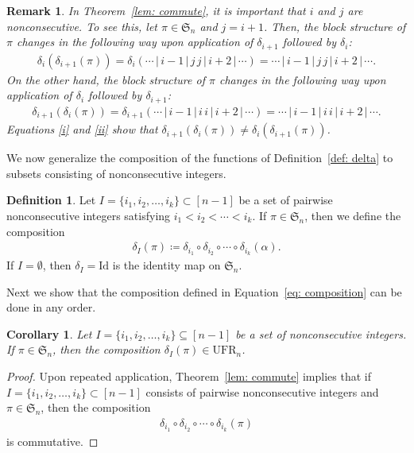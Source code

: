 \documentclass[11pt,reqno]{amsart}
\newtheorem{corollary}{Corollary}[section]
\newtheorem{remark}{Remark}[section]
\theoremstyle{definition}
\newtheorem{definition}{Definition}[section]
\theoremstyle{notation}
\theoremstyle{openproblem}
\newcommand{\Sym}{\mathfrak{S}}
\newcommand{\UFR}[1]{\text{UFR}_{#1}}
\begin{document}
\begin{remark}
\label{rem:nocommute}
    In Theorem~\ref{lem: commute}, it is important that $i$ and $j$ are nonconsecutive. 
    To see this, let $\pi \in \Sym_n$ and $j=i+1$. 
    Then, the block structure of $\pi$ changes in the following way upon application of $\delta_{i+1}$ followed by $\delta_i$:
    \begin{align}\label{i}
    \delta_i(\delta_{i+1}(\pi))=\delta_i(\cdots\,|\,i-1\,|\,j\,j\,|\,i+2\,|\,\cdots) = \cdots\,|\,i-1\,|\,j\,j\,|\,i+2\,|\,\cdots.
    \end{align}
    On the other hand, 
    the block structure of $\pi$ changes in the following way upon application of $\delta_{i}$ followed by $\delta_{i+1}$:
    \begin{align}
        \delta_{i+1}(\delta_i(\pi))=\delta_{i+1}(\cdots\,|\,i-1\,|\,i\,i\,|\,i+2\,|\,\cdots)=\cdots\,|\,i-1\,|\,i\,i\,|\,i+2\,|\,\cdots.\label{ii} 
    \end{align}
    Equations \eqref{i} and \eqref{ii} show that $\delta_{i+1}(\delta_i(\pi)) \neq \delta_i(\delta_{i+1}(\pi))$.
\end{remark}

We now generalize the composition of the functions of Definition~\ref{def: delta} to subsets consisting of nonconsecutive integers.

\begin{definition}
    Let $I=\{i_1,i_2,\ldots,i_k\} \subset [n-1]$ be a set of pairwise nonconsecutive integers satisfying $i_1<i_2<\cdots<i_k$. 
    If $\pi \in \Sym_n$, then we define the composition 
\begin{align}
\label{eq: composition}
\delta_I(\pi)\coloneqq\delta_{i_1}\circ \delta_{i_2}\circ\cdots\circ\delta_{i_k}(\alpha).
\end{align} 
If $I=\emptyset$, then $\delta_I = \mbox{Id}$ is the identity map on $\Sym_n$.
\end{definition}

Next we show that the composition defined in Equation~\eqref{eq: composition} can be done in any order.

\begin{corollary}\label{lem:composition}
    Let $I=\{i_1,i_2,\ldots,i_k\}\subseteq[n-1]$ 
be a set of nonconsecutive integers. If $\pi\in \Sym_n$, 
then the composition $    \delta_I(\pi)\in \UFR{n}$.
\end{corollary}
\begin{proof}
    Upon repeated application, Theorem~\ref{lem: commute} implies that if $I=\{i_1,i_2,\ldots,i_k\} \subset [n-1]$ consists of pairwise nonconsecutive integers and $\pi \in \Sym_n$, then the composition 
\begin{align}\label{eq: composition restated}
    \delta_{i_1}\circ \delta_{i_2}\circ\cdots\circ\delta_{i_k}(\pi)
\end{align} 
is commutative. 
\end{proof}
\end{document}
